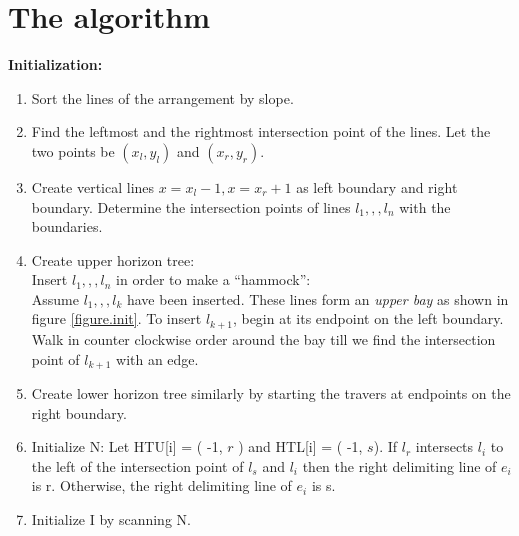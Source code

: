 \documentclass[12pt]{article}
\begin{document}
        \section{The algorithm} %
        \label{sec:algo}

        {\bf Initialization:}

        \begin{enumerate}
            \item  Sort the lines of the arrangement by slope.
            \item  Find the leftmost and the rightmost intersection point of the
                lines.
                Let the two points be $(x_{l},y_{l})$ and $(x_{r},y_{r})$.
            \item Create vertical lines $x = x_{l} - 1 , x = x_{r} + 1 $ as left
                boundary and right boundary.
                Determine the intersection points of  lines $l_{1}, , , l_{n}$
                with the boundaries.
            \item Create upper horizon tree:\\
                Insert $l_{1}, , , l_{n}$ in order to make a ``hammock'': \\
                Assume $l_{1}, , , l_{k}$ have been inserted. These lines form
                an {\em upper bay} as shown in figure \ref{figure.init}. To insert
                $l_{k+1}$, begin at its endpoint on the left boundary. Walk in
                counter clockwise order around the bay till we find the
                intersection point of $l_{k+1}$ with an edge.
            \item Create lower horizon tree similarly by starting the travers at
                endpoints on the right boundary.
            \item Initialize N:
                Let HTU[i] = ( -1, $r$ ) and HTL[i] = ( -1, $s$).  If $l_{r}$
                intersects $l_{i}$ to the left of the intersection point of
                $l_{s}$ and $l_{i}$ then the right delimiting line of $e_{i}$
                is r. Otherwise, the right delimiting line of $e_{i}$ is s.
            \item Initialize I by scanning N.
        \end{enumerate}
\end{document}
